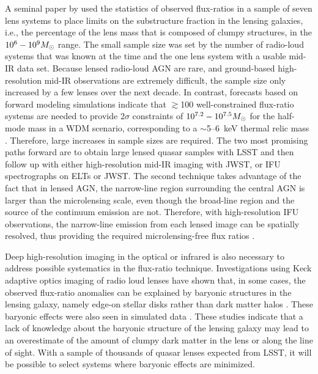 A seminal paper by \cite{Dalal:2002aa} used the statistics of observed flux-ratios in a sample of seven lens systems to place limits on the substructure fraction in the lensing galaxies, i.e., the percentage of the lens mass that is composed of clumpy structures, in the $10^6 - 10^9 M_\odot$ range.
The small sample size was set by the number of radio-loud systems that was known at the time and the one lens system with a usable mid-IR data set.  
Because lensed radio-loud AGN are rare, and ground-based high-resolution mid-IR observations are extremely difficult, the sample size only increased by a few lenses over the next decade.  
In contrast, forecasts based on forward modeling simulations indicate that $\gtrsim$100 well-constrained flux-ratio systems are needed to provide 2$\sigma$ constraints of $10^{7.2} - 10^{7.5} M_\odot$ for the half-mode mass in a WDM scenario, corresponding to a $\sim$5--6~keV thermal relic mass \citep{Gilman++18}.
Therefore, large increases in sample sizes are required.
The two most promising paths forward are to obtain large lensed quasar samples with LSST and then follow up with either high-resolution mid-IR imaging with JWST, or IFU spectrographs on ELTs or JWST.  The second technique takes advantage of the fact that in lensed AGN, the narrow-line region surrounding the central AGN is larger than the microlensing scale, even though the broad-line region and the source of the continuum emission are not.  Therefore, with high-resolution IFU observations, the narrow-line emission from each lensed image can be spatially resolved, thus providing the required microlensing-free flux ratios \citep{MoustakasMetcalf03, Nierenberg++14, Nierenberg:2017vlg}.

Deep high-resolution imaging in the optical or infrared is also necessary to address possible systematics in the flux-ratio technique.  
Investigations using Keck adaptive optics imaging of radio loud lenses have shown that, in some cases, the observed flux-ratio anomalies can be explained by baryonic structures in the lensing galaxy, namely edge-on stellar disks rather than dark matter halos \citep{Hsueh++2016, Hsueh++2017}.
These baryonic effects were also seen in simulated data \citep{Gilman++2017, Hsueh++2018}.
These studies indicate that a lack of knowledge about the baryonic structure of the lensing galaxy may lead to an overestimate of the amount of clumpy dark matter in the lens or along the line of sight.
With a sample of thousands of quasar lenses expected from LSST, it will be possible to select systems where baryonic effects are minimized.

